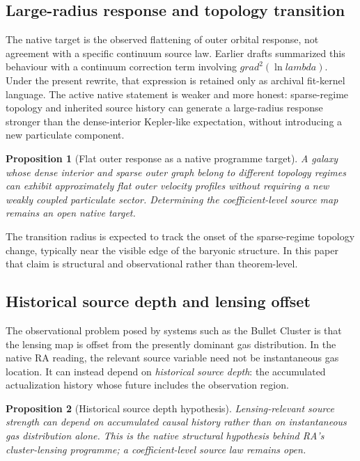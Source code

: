\documentclass[11pt]{article}
\def\lambda{lambda}%
\def\nabla{grad}%
\newtheorem{proposition}{Proposition}
\begin{document}
\subsection{Large-radius response and topology transition}
\label{sec:rotation_curves}

The native target is the observed flattening of outer orbital response, not agreement with a specific continuum source law. Earlier drafts summarized this behaviour with a continuum correction term involving $\nabla^2(\ln\lambda)$. Under the present rewrite, that expression is retained only as archival fit-kernel language. The active native statement is weaker and more honest: sparse-regime topology and inherited source history can generate a large-radius response stronger than the dense-interior Kepler-like expectation, without introducing a new particulate component.

\begin{proposition}[Flat outer response as a native programme target]
\label{prop:rotation_curve}
A galaxy whose dense interior and sparse outer graph belong to different topology regimes can exhibit approximately flat outer velocity profiles without requiring a new weakly coupled particulate sector. Determining the coefficient-level source map remains an open native target.
\end{proposition}

The transition radius is expected to track the onset of the sparse-regime topology change, typically near the visible edge of the baryonic structure. In this paper that claim is structural and observational rather than theorem-level.

\subsection{Historical source depth and lensing offset}
\label{sec:bullet_cluster}

The observational problem posed by systems such as the Bullet Cluster is that the lensing map is offset from the presently dominant gas distribution. In the native RA reading, the relevant source variable need not be instantaneous gas location. It can instead depend on \emph{historical source depth}: the accumulated actualization history whose future includes the observation region.

\begin{proposition}[Historical source depth hypothesis]
\label{prop:weyl_ricci}
Lensing-relevant source strength can depend on accumulated causal history rather than on instantaneous gas distribution alone. This is the native structural hypothesis behind RA's cluster-lensing programme; a coefficient-level source law remains open.
\end{proposition}
\end{document}

